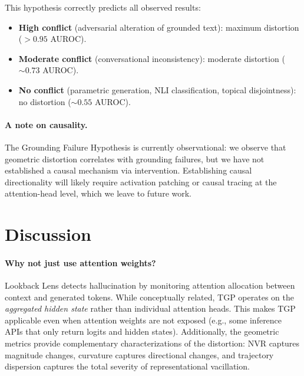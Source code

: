 \documentclass[10pt]{article}
\newcommand{\tgp}{\textsc{TGP}\xspace}
\begin{document}
This hypothesis correctly predicts all observed results:
\begin{itemize}[nosep,leftmargin=*]
    \item \textbf{High conflict} (adversarial alteration of grounded text): maximum distortion ($> 0.95$ AUROC).
    \item \textbf{Moderate conflict} (conversational inconsistency): moderate distortion (${\sim}0.73$ AUROC).
    \item \textbf{No conflict} (parametric generation, NLI classification, topical disjointness): no distortion (${\sim}0.55$ AUROC).
\end{itemize}

\paragraph{A note on causality.}
The Grounding Failure Hypothesis is currently observational: we observe that geometric distortion correlates with grounding failures, but we have not established a causal mechanism via intervention.
Establishing causal directionality will likely require activation patching \citep{elhage2021mathematical} or causal tracing at the attention-head level, which we leave to future work.

\section{Discussion}
\label{sec:discussion}

\paragraph{Why not just use attention weights?}
Lookback Lens \citep{chuang2024lookback} detects hallucination by monitoring attention allocation between context and generated tokens.
While conceptually related, \tgp operates on the \emph{aggregated hidden state} rather than individual attention heads.
This makes \tgp applicable even when attention weights are not exposed (e.g., some inference APIs that only return logits and hidden states).
Additionally, the geometric metrics provide complementary characterizations of the distortion: NVR captures magnitude changes, curvature captures directional changes, and trajectory dispersion captures the total severity of representational vacillation.
\end{document}
